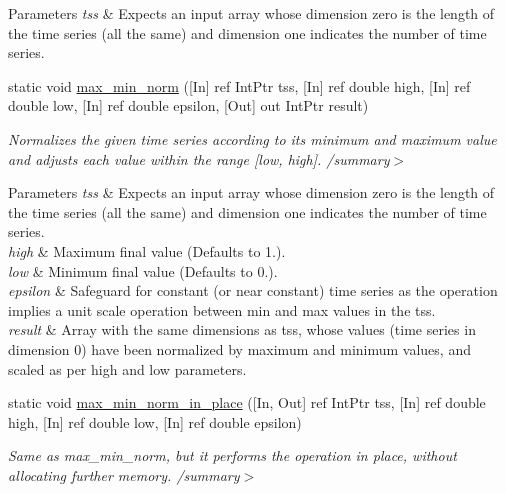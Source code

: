 \begin{DoxyCompactItemize}
\begin{DoxyCompactList}
\begin{DoxyParams}{Parameters}
{\em tss} & Expects an input array whose dimension zero is the length of the time series (all the same) and dimension one indicates the number of time series.\\
\hline
\end{DoxyParams}
\end{DoxyCompactList}\item 
static void \mbox{\hyperlink{classkhiva_1_1interop_1_1_d_l_l_normalization_ab6df70047b9dcf69e9723fe2fb3d920a}{max\+\_\+min\+\_\+norm}} (\mbox{[}In\mbox{]} ref Int\+Ptr tss, \mbox{[}In\mbox{]} ref double high, \mbox{[}In\mbox{]} ref double low, \mbox{[}In\mbox{]} ref double epsilon, \mbox{[}Out\mbox{]} out Int\+Ptr result)
\begin{DoxyCompactList}\small\item\em Normalizes the given time series according to its minimum and maximum value and adjusts each value within the range \mbox{[}low, high\mbox{]}. /summary$>$ 
\begin{DoxyParams}{Parameters}
{\em tss} & Expects an input array whose dimension zero is the length of the time series (all the same) and dimension one indicates the number of time series.\\
\hline
{\em high} & Maximum final value (Defaults to 1.).\\
\hline
{\em low} & Minimum final value (Defaults to 0.).\\
\hline
{\em epsilon} & Safeguard for constant (or near constant) time series as the operation implies a unit scale operation between min and max values in the tss.\\
\hline
{\em result} & Array with the same dimensions as tss, whose values (time series in dimension 0) have been normalized by maximum and minimum values, and scaled as per high and low parameters.\\
\hline
\end{DoxyParams}
\end{DoxyCompactList}\item 
static void \mbox{\hyperlink{classkhiva_1_1interop_1_1_d_l_l_normalization_afc93cd8f4b41be72d52a2d606d0cdf92}{max\+\_\+min\+\_\+norm\+\_\+in\+\_\+place}} (\mbox{[}In, Out\mbox{]} ref Int\+Ptr tss, \mbox{[}In\mbox{]} ref double high, \mbox{[}In\mbox{]} ref double low, \mbox{[}In\mbox{]} ref double epsilon)
\begin{DoxyCompactList}\small\item\em Same as max\+\_\+min\+\_\+norm, but it performs the operation in place, without allocating further memory. /summary$>$ 

\end{DoxyCompactList}
\end{DoxyCompactItemize}
